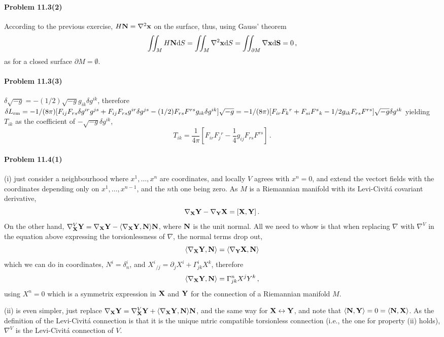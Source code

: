 \documentclass[a4paper,12pt]{article}
\def\d{\mathrm{d}}
\newcommand{\problem}[1]{\paragraph{Problem #1}}
\begin{document}

\problem{11.3(2)} According to the previous exercise, $H{\bf N} = \nabla^2 {\bf x}$ on the surface, thus, using Gauss' theorem
\[
 \iint_M H{\bf N}\d S = \iint_M \nabla^2 {\bf x}\d S = \iint_{\partial M}\nabla {\bf x}\d{\bf S} = 0\,,
\]
as for a closed surface $\partial M=\emptyset$.


\problem{11.3(3)} $\delta\sqrt{-g} = -(1/2)\sqrt{-g}g_{ik}\delta g^{ik}$, therefore $\delta L_{\rm rm} = -1/(8\pi)[ F_{ij}F_{rs}\delta g^{ir}g^{js} + F_{ij}F_{rs}g^{ir}\delta g^{js}-(1/2)F_{rs}F^{rs}g_{ik}\delta g^{ik}]\sqrt{-g} = -1/(8\pi)[ F_{ir}F_k{}^r + F_{si}F^s{}_{k}-1/2 g_{ik}F_{rs}F^{rs}]\sqrt{-g}\delta g^{ik}$ yielding $T_{ik}$ as the coefficient of $-\sqrt{-g}\delta g^{ik}$,
\[
 T_{ik} = \frac{1}{4\pi}\left[F_{ir}F_j{}^r - \frac{1}{4}g_{ij}F_{rs}F^{rs} \right]\,.
\]


\problem{11.4(1)} (i) just consider a neighbourhood where $x^1, \dots, x^n$ are coordinates, and locally $V$ agrees with $x^n=0$, and extend the vectort fields with the coordinates depending only on $x^1, \dots, x^{n-1}$, and the $n$th one being zero. As $M$ is a Riemannian manifold with its Levi-Civitá covariant derivative,
\[
 \nabla_{\bf X} {\bf Y} - \nabla_{\bf Y} {\bf X} = [{\bf X}, {\bf Y}]\,.
\]
On the other hand, $\nabla^V_{\bf X} {\bf Y} = \nabla_{\bf X} {\bf Y} - \langle \nabla_{\bf X} {\bf Y}, {\bf N} \rangle {\bf N}$, where ${\bf N}$ is the unit normal. All we need to whow is that when replacing $\nabla$ with $\nabla^V$ in the equation above expressing the torsionlessness of $\nabla$, the normal terms drop out,
\[
 \langle \nabla_{\bf X} {\bf Y}, {\bf N} \rangle = \langle \nabla_{\bf Y} {\bf X}, {\bf N} \rangle
\]
which we can do in coordinates, $N^i = \delta^i_n$, and
$X^i{}_{/j}  =\partial_j X^i + \Gamma^i_{jk}X^k$, therefore
\[
 \langle \nabla_{\bf X} {\bf Y}, {\bf N} \rangle = 
 \Gamma^n_{jk}X^j Y^k\,,
\]
using $X^n = 0$ which is a symmetrix expression in ${\bf X}$ and ${\bf Y}$ for the connection of a Riemannian manifold $M$.

(ii) is even simpler, just replace $\nabla_{\bf X} {\bf Y} = \nabla_{\bf X}^V {\bf Y} + \langle \nabla_{\bf X} {\bf Y}, {\bf N}\rangle {\bf N}$, and the same way for ${\bf X}\leftrightarrow {\bf Y}$, and note that $\langle {\bf N}, {\bf Y}\rangle = 0 = \langle {\bf N}, {\bf X}\rangle$. As the definition of the Levi-Civitá connection is that it is the unique mtric compatible torsionless connection (i.e., the one for property (ii) holds), $\nabla^V$ is the Levi-Civitá connection of $V$.
\end{document}
